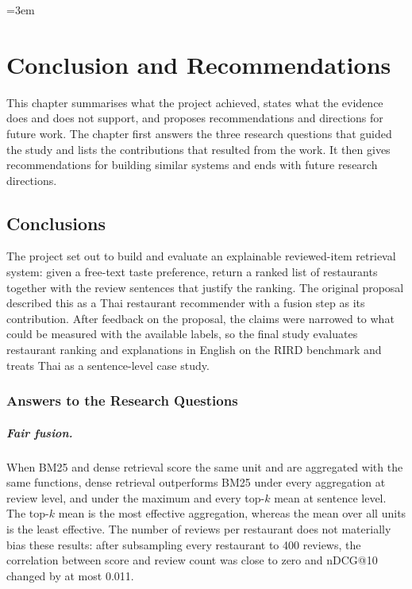 \providecommand{\mpnet}{\texttt{paraphrase-\allowbreak multilingual-\allowbreak mpnet-\allowbreak base-\allowbreak v2}}
\emergencystretch=3em
\providecommand{\pending}[1]{\textbf{[PENDING: #1]}}

\chapter{Conclusion and Recommendations}
\label{chap:conclusion}

This chapter summarises what the project achieved, states what the evidence does and does not support, and proposes recommendations and directions for future work. The chapter first answers the three research questions that guided the study and lists the contributions that resulted from the work. It then gives recommendations for building similar systems and ends with future research directions.

\section{Conclusions}
\label{sec:conclusions}

The project set out to build and evaluate an explainable reviewed-item retrieval system: given a free-text taste preference, return a ranked list of restaurants together with the review sentences that justify the ranking. The original proposal described this as a Thai restaurant recommender with a fusion step as its contribution. After feedback on the proposal, the claims were narrowed to what could be measured with the available labels, so the final study evaluates restaurant ranking and explanations in English on the RIRD benchmark and treats Thai as a sentence-level case study.

\subsection{Answers to the Research Questions}
\label{sec:rqanswers}

\paragraph{Fair fusion.} When BM25 and dense retrieval score the same unit and are aggregated with the same functions, dense retrieval outperforms BM25 under every aggregation at review level, and under the maximum and every top-$k$ mean at sentence level. The top-$k$ mean is the most effective aggregation, whereas the mean over all units is the least effective. The number of reviews per restaurant does not materially bias these results: after subsampling every restaurant to 400 reviews, the correlation between score and review count was close to zero and nDCG@10 changed by at most 0.011.

